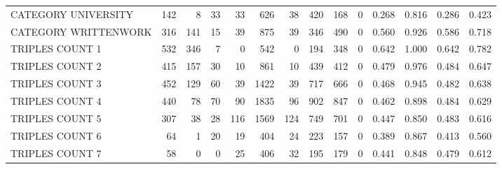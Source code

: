 \begin{tabular}{lrrrrrrrrrllll}
 CATEGORY UNIVERSITY      &             142 &             8 &              33 &              33 &             626 &   38 &  420 &  168 &    0 & 0.268 & 0.816 & 0.286 & 0.423 \\
 CATEGORY WRITTENWORK     &             316 &           141 &              15 &              39 &             875 &   39 &  346 &  490 &    0 & 0.560 & 0.926 & 0.586 & 0.718 \\
 TRIPLES COUNT 1          &             532 &           346 &               7 &               0 &             542 &    0 &  194 &  348 &    0 & 0.642 & 1.000 & 0.642 & 0.782 \\
 TRIPLES COUNT 2          &             415 &           157 &              30 &              10 &             861 &   10 &  439 &  412 &    0 & 0.479 & 0.976 & 0.484 & 0.647 \\
 TRIPLES COUNT 3          &             452 &           129 &              60 &              39 &            1422 &   39 &  717 &  666 &    0 & 0.468 & 0.945 & 0.482 & 0.638 \\
 TRIPLES COUNT 4          &             440 &            78 &              70 &              90 &            1835 &   96 &  902 &  847 &    0 & 0.462 & 0.898 & 0.484 & 0.629 \\
 TRIPLES COUNT 5          &             307 &            38 &              28 &             116 &            1569 &  124 &  749 &  701 &    0 & 0.447 & 0.850 & 0.483 & 0.616 \\
 TRIPLES COUNT 6          &              64 &             1 &              20 &              19 &             404 &   24 &  223 &  157 &    0 & 0.389 & 0.867 & 0.413 & 0.560 \\
 TRIPLES COUNT 7          &              58 &             0 &               0 &              25 &             406 &   32 &  195 &  179 &    0 & 0.441 & 0.848 & 0.479 & 0.612 \\
\hline
\end{tabular}